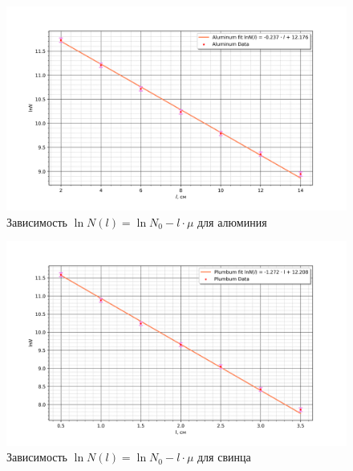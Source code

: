 \documentclass[a4paper]{article}
\begin{document}
\begin{enumerate}
    \begin{figure}[H]
        \begin{center}
        \includegraphics[scale = 0.65]{Al.png}
        \caption{Зависимость $\ln{N}(l) = \ln{N_0} -  l\cdot \mu $ для алюминия}
        \label{Al}
        \end{center}
    \end{figure}

    \begin{figure}[H]
        \begin{center}
        \includegraphics[scale = 0.65]{Pb.png}
        \caption{Зависимость $\ln{N}(l) = \ln{N_0} -  l\cdot \mu $ для свинца}
        \label{Pb}
        \end{center}
    \end{figure}


\end{enumerate}
\end{document}
